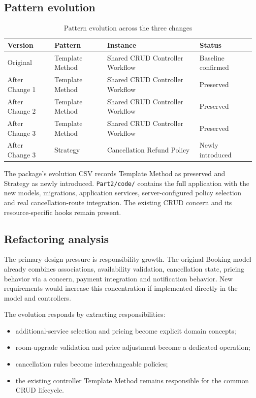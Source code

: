 \documentclass[10pt,a4paper]{article}
\newcommand{\code}[1]{\texttt{\small #1}}
\begin{document}
\subsection{Pattern evolution}

\begin{table}[H]
\centering
\caption{Pattern evolution across the three changes}
\label{tab:evolution}
\begin{tabularx}{\linewidth}{l l X l}
\toprule
Version & Pattern & Instance & Status\\
\midrule
Original & Template Method & Shared CRUD Controller Workflow & Baseline confirmed\\
After Change 1 & Template Method & Shared CRUD Controller Workflow & Preserved\\
After Change 2 & Template Method & Shared CRUD Controller Workflow & Preserved\\
After Change 3 & Template Method & Shared CRUD Controller Workflow & Preserved\\
After Change 3 & Strategy & Cancellation Refund Policy & Newly introduced\\
\bottomrule
\end{tabularx}
\end{table}

The package's evolution CSV records Template Method as preserved and Strategy as newly introduced. \code{Part2/code/} contains the full application with the new models, migrations, application services, server-configured policy selection and real cancellation-route integration. The existing CRUD concern and its resource-specific hooks remain present.

\subsection{Refactoring analysis}

The primary design pressure is responsibility growth. The original Booking model already combines associations, availability validation, cancellation state, pricing behavior via a concern, payment integration and notification behavior. New requirements would increase this concentration if implemented directly in the model and controllers.

The evolution responds by extracting responsibilities:

\begin{itemize}[leftmargin=*]
\item additional-service selection and pricing become explicit domain concepts;
\item room-upgrade validation and price adjustment become a dedicated operation;
\item cancellation rules become interchangeable policies;
\item the existing controller Template Method remains responsible for the common CRUD lifecycle.
\end{itemize}
\end{document}
